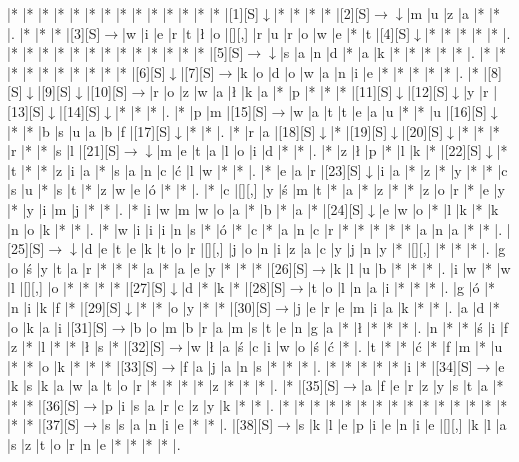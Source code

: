 \documentclass[11pt]{article}
\newcommand\drarr{$\rightarrow \!\!\!\!\! \downarrow$}
\newcommand\rarr{$\rightarrow$}
\newcommand\darr{$\downarrow$}
\begin{document}
\noindent\begin{Puzzle}{25}{22}|*	|*	|*	|*	|*	|*	|*	|*	|*	|*	|*	|*	|*	|*	|[1][S]\darr	|*	|*	|*	|*	|[2][S]\drarr	|m	|u	|z	|a	|*	|*	|.
|*	|*	|*	|[3][S]\rarr	|w	|i	|e	|r	|t	|ł	|o	|[][,]{ }	|r	|u	|r	|o	|w	|e	|*	|t	|[4][S]\darr	|*	|*	|*	|*	|*	|.
|*	|*	|*	|*	|*	|*	|*	|*	|*	|*	|*	|*	|*	|[5][S]\drarr	|s	|a	|n	|d	|*	|a	|k	|*	|*	|*	|*	|*	|.
|*	|*	|*	|*	|*	|*	|*	|*	|*	|*	|[6][S]\darr	|[7][S]\rarr	|k	|o	|d	|o	|w	|a	|n	|i	|e	|*	|*	|*	|*	|*	|.
|*	|[8][S]\darr	|[9][S]\darr	|[10][S]\rarr	|r	|o	|z	|w	|a	|ł	|k	|a	|*	|p	|*	|*	|*	|[11][S]\darr	|[12][S]\darr	|y	|r	|[13][S]\darr	|[14][S]\darr	|*	|*	|*	|.
|*	|p	|m	|[15][S]\rarr	|w	|a	|t	|t	|e	|a	|u	|*	|*	|u	|[16][S]\darr	|*	|*	|b	|s	|u	|a	|b	|f	|[17][S]\darr	|*	|*	|.
|*	|r	|a	|[18][S]\darr	|*	|[19][S]\darr	|[20][S]\darr	|*	|*	|*	|r	|*	|*	|s	|l	|[21][S]\drarr	|m	|e	|t	|a	|l	|o	|i	|d	|*	|*	|.
|*	|z	|ł	|p	|*	|l	|k	|*	|[22][S]\darr	|*	|t	|*	|*	|z	|i	|a	|*	|s	|a	|n	|c	|ć	|l	|w	|*	|*	|.
|*	|e	|a	|r	|[23][S]\darr	|i	|a	|*	|z	|*	|y	|*	|*	|c	|s	|u	|*	|s	|t	|*	|z	|w	|e	|ó	|*	|*	|.
|*	|c	|[][,]{ }	|y	|ś	|m	|t	|*	|a	|*	|z	|*	|*	|z	|o	|r	|*	|e	|y	|*	|y	|i	|m	|j	|*	|*	|.
|*	|i	|w	|m	|w	|o	|a	|*	|b	|*	|a	|*	|[24][S]\darr	|e	|w	|o	|*	|l	|k	|*	|k	|n	|o	|k	|*	|*	|.
|*	|w	|i	|i	|i	|n	|s	|*	|ó	|*	|c	|*	|a	|n	|c	|r	|*	|*	|*	|*	|*	|a	|n	|a	|*	|*	|.
|[25][S]\drarr	|d	|e	|t	|e	|k	|t	|o	|r	|[][,]{ }	|j	|o	|n	|i	|z	|a	|c	|y	|j	|n	|y	|*	|[][,]{ }	|*	|*	|*	|.
|g	|o	|ś	|y	|t	|a	|r	|*	|*	|*	|a	|*	|a	|e	|y	|*	|*	|*	|[26][S]\rarr	|k	|l	|u	|b	|*	|*	|*	|.
|i	|w	|*	|w	|l	|[][,]{ }	|o	|*	|*	|*	|*	|[27][S]\darr	|d	|*	|k	|*	|[28][S]\rarr	|t	|o	|l	|n	|a	|i	|*	|*	|*	|.
|g	|ó	|*	|n	|i	|k	|f	|*	|[29][S]\darr	|*	|*	|o	|y	|*	|*	|[30][S]\rarr	|j	|e	|r	|e	|m	|i	|a	|k	|*	|*	|.
|a	|d	|*	|o	|k	|a	|i	|[31][S]\rarr	|b	|o	|m	|b	|r	|a	|m	|s	|t	|e	|n	|g	|a	|*	|ł	|*	|*	|*	|.
|n	|*	|*	|ś	|i	|f	|z	|*	|l	|*	|*	|ł	|s	|*	|[32][S]\rarr	|w	|ł	|a	|ś	|c	|i	|w	|o	|ś	|ć	|*	|.
|t	|*	|*	|ć	|*	|f	|m	|*	|u	|*	|*	|o	|k	|*	|*	|*	|[33][S]\rarr	|f	|a	|j	|a	|n	|s	|*	|*	|*	|.
|*	|*	|*	|*	|*	|i	|*	|[34][S]\rarr	|e	|k	|s	|k	|a	|w	|a	|t	|o	|r	|*	|*	|*	|*	|z	|*	|*	|*	|.
|*	|[35][S]\rarr	|a	|f	|e	|r	|z	|y	|s	|t	|a	|*	|*	|*	|[36][S]\rarr	|p	|i	|s	|a	|r	|c	|z	|y	|k	|*	|*	|.
|*	|*	|*	|*	|*	|*	|*	|*	|*	|*	|*	|*	|*	|*	|*	|*	|*	|[37][S]\rarr	|s	|s	|a	|n	|i	|e	|*	|*	|.
|[38][S]\rarr	|s	|k	|l	|e	|p	|i	|e	|n	|i	|e	|[][,]{ }	|k	|l	|a	|s	|z	|t	|o	|r	|n	|e	|*	|*	|*	|*	|.\end{Puzzle}

\newpage
\end{document}
